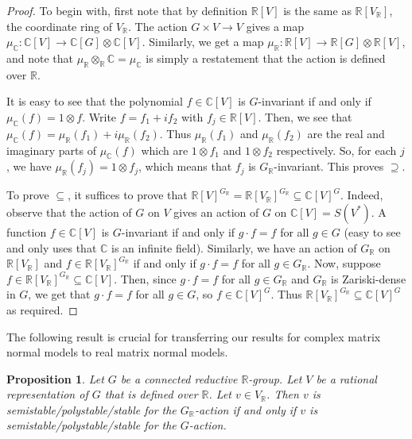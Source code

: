 \documentclass[11pt]{amsart}
\newtheorem{proposition}[theorem]{Proposition}
\theoremstyle{definition}
\newcommand{\R}{{\mathbb R}}
\newcommand{\C}{{\mathbb C}}
\newcommand{\Sym}{S}
\begin{document}
\begin{proof}
To begin with, first note that by definition $\R[V]$ is the same as $\R[V_\R]$, the coordinate ring of $V_\R$. The action $G \times V \rightarrow V$ gives a map $\mu_\C:\C[V] \rightarrow \C[G] \otimes \C[V]$. Similarly, we get a map $\mu_\R: \R[V] \rightarrow \R[G] \otimes \R[V]$, and note that $\mu_\R \otimes_\R \C = \mu_\C$ is simply a restatement that the action is defined over $\R$.

It is easy to see that the polynomial $f \in \C[V]$ is $G$-invariant if and only if $\mu_\C(f) = 1 \otimes f$. Write $f = f_1 + i f_2$ with $f_j \in \R[V]$. Then, we see that $\mu_\C(f) = \mu_\R(f_1) + i \mu_\R(f_2)$. Thus $\mu_\R(f_1)$ and $\mu_\R(f_2)$ are the real and imaginary parts of $\mu_\C(f)$ which are $1 \otimes f_1$ and $1 \otimes f_2$ respectively. So, for each $j$, we have $\mu_\R(f_j) = 1 \otimes f_j$, which means that $f_j$ is $G_\R$-invariant. This proves $\supseteq$. 


To prove $\subseteq$, it suffices to prove that $\R[V]^{G_\R} = \R[V_\R]^{G_\R} \subseteq \C[V]^G$. Indeed, observe that the action of $G$ on $V$ gives an action of $G$ on $\C[V] = \Sym(V^*)$. A function $f \in \C[V]$ is $G$-invariant if and only if $g \cdot f = f$ for all $g \in G$ (easy to see and only uses that $\C$ is an infinite field). Similarly, we have an action of $G_\R$ on $\R[V_\R]$ and $f \in \R[V_\R]^{G_\R}$ if and only if $g \cdot f = f$ for all $g \in G_\R$. Now, suppose $f \in \R[V_\R]^{G_\R} \subseteq \C[V]$. Then, since $g \cdot f = f$ for all $g \in G_\R$ and $G_\R$ is Zariski-dense in $G$, we get that $g \cdot f = f$ for all $g \in G$, so $f \in \C[V]^G$. Thus $\R[V_\R]^{G_\R} \subseteq \C[V]^G$ as required.
\end{proof}




The following result is crucial for transferring our results for complex matrix normal models to real matrix normal models.

\begin{proposition} \label{prop:transfer}
Let $G$ be a connected reductive $\R$-group. Let $V$ be a rational representation of $G$ that is defined over $\R$. Let $v \in V_\R$. Then $v$ is semistable/polystable/stable for the $G_\R$-action if and only if $v$ is semistable/polystable/stable for the $G$-action.
\end{proposition}
\end{document}
